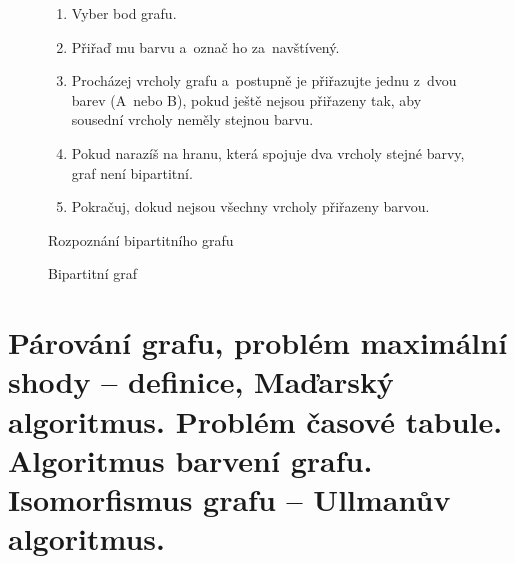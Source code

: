 \begin{figure}[htbp]
    \begin{minipage}{0.55\textwidth}
        \small
        \onehalfspacing
        \begin{enumerate}
            \item Vyber bod grafu.
            \item Přiřaď mu barvu a~označ ho za~navštívený.
            \item Procházej vrcholy grafu a~postupně je přiřazujte jednu z~dvou barev (A~nebo B), pokud ještě nejsou přiřazeny tak, aby sousední vrcholy neměly stejnou barvu.
            \item Pokud narazíš na hranu, která spojuje dva vrcholy stejné barvy, graf není bipartitní.
            \item Pokračuj, dokud nejsou všechny vrcholy přiřazeny barvou.
        \end{enumerate}
        \caption{Rozpoznání bipartitního grafu}
        \label{fig:alg-barveni}
    \end{minipage}
    \hfill
    \begin{minipage}{0.35\textwidth}
        \small
        \onehalfspacing
        \centering
        \caption{Bipartitní graf}
        \label{fig:bipartitni-graf}
    \end{minipage}
\end{figure}
\FloatBarrier

\clearpage
\section{Párování grafu, problém maximální shody -- definice, Maďarský algoritmus. Problém časové tabule. Algoritmus barvení grafu. Isomorfismus grafu -- Ullmanův algoritmus.}

